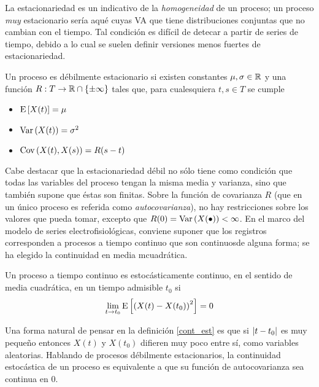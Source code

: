 La estacionariedad es un indicativo de la \textit{homogeneidad} de un proceso; un proceso 
\textit{muy} estacionario sería aqué cuyas VA que tiene distribuciones conjuntas que no cambian 
con el tiempo. 
%
Tal condición es difícil de detecar a partir de series de tiempo, debido a lo cual se suelen 
definir versiones menos fuertes de estacionariedad.

\begin{definicion}
Un proceso \xt es débilmente estacionario si existen constantes $\mu, \sigma \in \mathbb{R}$ y una función 
$R : T \rightarrow \mathbb{R} \cap \{ \pm \infty \} $ tales que, para cualesquiera $t, s \in T$ se cumple
\begin{itemize}
\item $\mathrm{E}\left[ X(t) \right] = \mu$
\item $\mathrm{Var}\left( X(t) \right) = \sigma^{2}$
\item $\mathrm{Cov}\left( X(t),X(s) \right) = R(s-t)$
\end{itemize}
\end{definicion}

Cabe destacar que la estacionariedad débil no sólo tiene como condición que todas las variables del
proceso tengan la misma media y varianza, sino que también supone que éstas son finitas.
%
Sobre la función de covarianza $R$ (que en un único proceso es referida como \textit{autocovarianza}),
no hay restricciones sobre los valores que pueda tomar, excepto que 
$R(0) = \mathrm{Var}\left( X(\bullet) \right) < \infty$. 
%
En el marco del modelo de series electrofisiológicas, conviene suponer que los registros 
corresponden a procesos a tiempo continuo que son continuosde alguna forma; se ha elegido la 
continuidad en media mcuadrática.


\begin{definicion}
Un proceso a tiempo continuo \xt es estocásticamente continuo, en el sentido de media cuadrática, 
en un tiempo admisible $t_0$ si
\begin{equation*}
\lim_{t \rightarrow t_0} \mathrm{E}\left[ \left( X(t) - X(t_0) \right)^{2} \right] = 0
\end{equation*}
\label{cont_est}
\end{definicion}

Una forma natural de pensar en la definición \ref{cont_est} es que si $\left| t-t_0 \right|$ es muy pequeño 
entonces $X(t)$ y $X(t_0)$ difieren muy poco entre sí, como variables aleatorias.
%
Hablando de procesos débilmente estacionarios, la continuidad estocástica de un proceso es 
equivalente a que su función de autocovarianza sea continua en 0.

